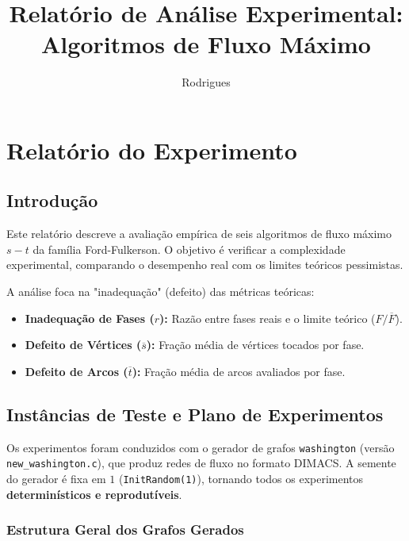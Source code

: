 \documentclass{infufrgs}
\title{Relatório de Análise Experimental: Algoritmos de Fluxo Máximo}
\author{Rodrigues}{Juliana}
\begin{document}
\maketitle

\chapter{Relatório do Experimento}

\section{Introdução}
Este relatório descreve a avaliação empírica de seis algoritmos de fluxo máximo $s-t$ da família Ford-Fulkerson. O objetivo é verificar a complexidade experimental, comparando o desempenho real com os limites teóricos pessimistas. 

A análise foca na "inadequação" (defeito) das métricas teóricas:
\begin{itemize}
    \item \textbf{Inadequação de Fases ($r$):} Razão entre fases reais e o limite teórico ($F/\overline{F}$). 
    \item \textbf{Defeito de Vértices ($\overline{s}$):} Fração média de vértices tocados por fase. 
    \item \textbf{Defeito de Arcos ($\overline{t}$):} Fração média de arcos avaliados por fase. 
\end{itemize}


\section{Instâncias de Teste e Plano de Experimentos}

Os experimentos foram conduzidos com o gerador de grafos \texttt{washington} (versão \texttt{new\_washington.c}), que produz redes de fluxo no formato DIMACS. A semente do gerador é fixa em $1$ (\texttt{InitRandom(1)}), tornando todos os experimentos \textbf{determinísticos e reprodutíveis}.

\subsection{Estrutura Geral dos Grafos Gerados}
\end{document}
